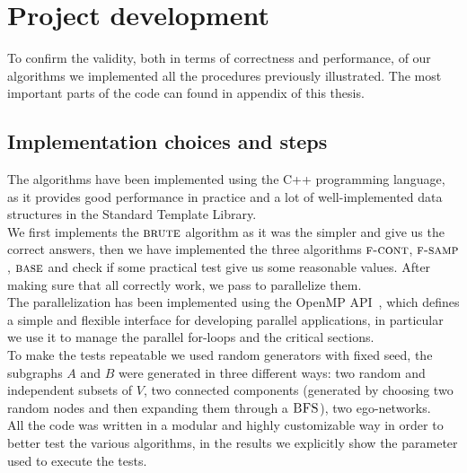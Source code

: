
\chapter{Project development}
    
    To confirm the validity, both in terms of correctness and performance, of our algorithms we implemented all the procedures previously illustrated. 
    The most important parts of the code can found in appendix of this thesis.
    
    \section{Implementation choices and steps}
    
    The algorithms have been implemented using the C++ programming language, 
    as it provides good performance in practice and a lot of well-implemented data structures in the Standard Template Library.\\
    
    We first implements the $\textsc{brute}$ algorithm as it was the simpler and give us the correct answers, then we have implemented the three algorithms $\textsc{f-cont}$, $\textsc{f-samp}$, $\textsc{base}$ and check if some practical test give us some reasonable values.
    After making sure that all correctly work, we pass to parallelize them.\\
    
    The parallelization has been implemented using the OpenMP API~\cite{openmp}, which defines a simple and flexible interface for developing parallel applications, in particular we use it to manage the parallel for-loops and the critical sections.\\
    
    To make the tests repeatable we used random generators with fixed seed, the subgraphs $A$ and $B$ were generated in three different ways: two random and independent subsets of $V$, two connected components (generated by choosing two random nodes and then expanding them through a $\textsc{BFS}$), two ego-networks.\\
    
    All the code was written in a modular and highly customizable way in order
    to better test the various algorithms, in the results we explicitly show the parameter used to execute the tests.
    
    \clearpage
    
